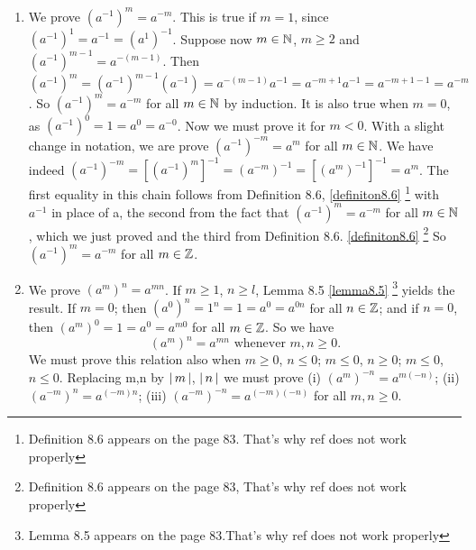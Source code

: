 \documentclass[11pt]{amsbook}
\begin{document}
\begin{enumerate}
	\item We prove $(a^{-1})^m = a^{-m}$. This is true if $m = 1$, since $(a^{-1})^{1} = a^{-1} =  (a^1)^{-1}$.
	Suppose now $m \in \mathbb{N}$, $m \geq 2$ and $(a^{-1})^{m-1} = a^{-(m-1)}$. Then $(a^{-1})^m = (a^{-1})^{m-1}(a^{-1}) = 
	a^{-(m-1)} a^{-1} = a^{-m+1} a^{-1} = a^{-m+1-1} = a^{-m}$. So $(a^{-1})^{m} = a^{-m}$ for all $m \in \mathbb{N} $ by induction. It is 
	also true when $m = 0$, as $(a^{-1})^0 = 1 = a^0 = a^{-0}$. Now we must prove it for $m < 0$. With a slight change in notation, we are 
	prove $(a^{-1})^{-m} = a^m$ for all $m \in \mathbb{N}$. We have indeed 
	$(a^{-1})^{-m} = [(a^{-1})^{m}]^{-1} = (a^{-m})^{-1} = [(a^m)^{-1}]^{-1} = a^m$.
	The first equality in this chain follows from Definition 8.6, \ref{definiton8.6} \footnote{ Definition 8.6 appears on the page 83. That's why ref does not work properly} 
	with $a^{-1}$ in place of a,
	the second from the fact that $(a^{-1})^m = a^{-m}$ for all $m \in \mathbb{N}$, which we just proved and the third from Definition 8.6. \ref{definiton8.6}
	\footnote{ Definition 8.6 appears on the page 83, That's why ref does not work properly}
	So $(a^{-1})^m = a^{-m}$ for all $m \in \mathbb{Z}$.
	
	\item We prove $(a^m)^n = a^{mn}$. If $m \geq 1$, $n \geq l$, Lemma 8.5 \ref{lemma8.5}
	\footnote{Lemma 8.5 appears on the page 83.That's why ref does not work properly} yields the result.
	If $m = 0$; then $(a^0)^n = 1^n = 1 =  a^0 = a^{0n}$ for all $n \in \mathbb{Z}$; and if $n = 0$, then
	$(a^m)^0 = 1 = a^0 = a^{m0}$ for all $m \in \mathbb{Z}$. So we have
	$$
		(a^m)^n = a^{mn} \text{ whenever } m,n \geq 0.
	$$
	We must prove this relation also when $m \geq 0$, $n \leq 0$; $m \leq 0$, $n \geq 0$; $m \leq 0$, $n \leq 0$. Replacing m,n by $\left \lvert \, m \, \right \rvert$, $\left \lvert \, n \, \right \rvert$
	we must prove (i) $(a^m)^{-n} = a^{m(-n)}$; (ii) $(a^{-m})^n = a^{(-m)n}$; (iii) $(a^{-m})^{-n} = a^{(-m)(-n)}$ for all $m, n \geq 0$. 

\end{enumerate}
\end{document}
